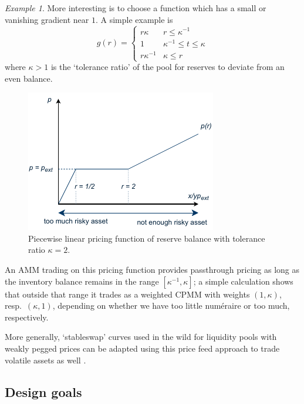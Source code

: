 \documentclass[a4paper,10pt]{article}
\theoremstyle{remark}
\newtheorem*{example}{Example}
\begin{document}
\begin{example}
  More interesting is to choose a function which has a small or vanishing gradient near $1$. A simple example is
  \[
    g(r) = \left\{\begin{array}{ll}
      r\kappa & r \leq \kappa^{-1} \\
      1           & \kappa^{-1} \leq t \leq \kappa \\
      r\kappa^{-1} & \kappa\leq r
    \end{array}\right.
  \]
  where $\kappa >1$ is the `tolerance ratio' of the pool for reserves to deviate from an even balance.
  \begin{figure}
    \begin{center} 
      \includegraphics{diagrams/price-curve.pdf}
      \caption{Piecewise linear pricing function of reserve balance with tolerance ratio $\kappa = 2$.}
    \end{center}
  \end{figure}
  An AMM trading on this pricing function provides passthrough pricing as long as the inventory balance remains in the range $[\kappa^{-1},\kappa]$; a simple calculation shows that outside that range it trades as a weighted CPMM with weights $(1,\kappa)$, resp.~$(\kappa,1)$, depending on whether we have too little num\'eraire or too much, respectively.
  
  More generally, `stableswap' curves used in the wild for liquidity pools with weakly pegged prices can be adapted using this price feed approach to trade volatile assets as well \cite{egorov2019stableswap, port2022mixing}.

\end{example}

\subsection{Design goals}
\end{document}
